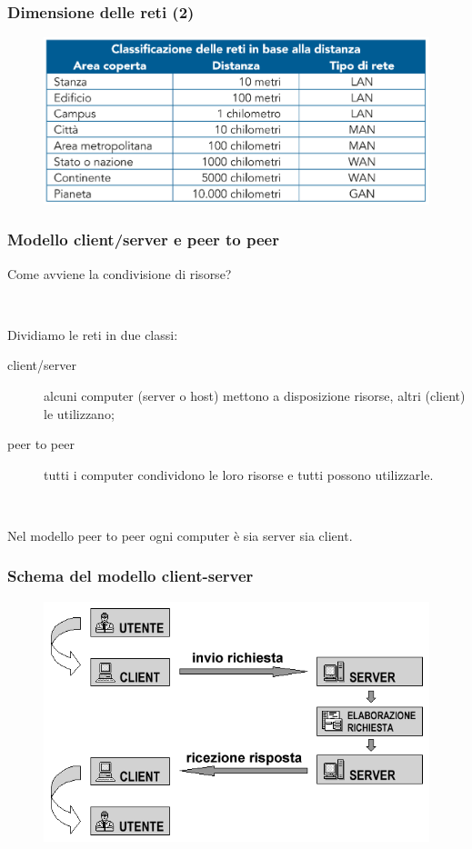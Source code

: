 \documentclass[]{beamer}
\begin{document}
\begin{frame}
  \frametitle{Dimensione delle reti (2)}
\begin{figure}
\includegraphics[width=.9\columnwidth]{img/dimensionereti.png}
\end{figure}
\end{frame}


\begin{frame}
\frametitle{Modello client/server e peer to peer}
Come avviene la condivisione di risorse?\pause

~

Dividiamo le reti in due classi:
\begin{description}
  \item[client/server] alcuni computer (server o host) mettono a disposizione risorse, altri (client) le utilizzano;\pause
  \item[peer to peer] tutti i computer condividono le loro risorse e tutti possono utilizzarle.\pause
\end{description}

~

Nel modello peer to peer ogni computer è sia server sia client.
\end{frame}

\begin{frame}
\frametitle{Schema del modello client-server}
\begin{figure}
\includegraphics[width=.7\columnwidth]{screenshots/clientserver.png}
\end{figure}
\end{frame}
\end{document}

